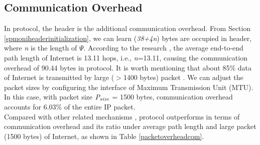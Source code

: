 \subsection{Communication Overhead}
In \name{} protocol, the \name{} header is the additional communication overhead. From Section \ref{spmoniheaderinitialization}, we can learn (\emph{38+4n}) bytes are occupied in \name{} header, where \emph{n} is the length of $\Psi$. According to the research \cite{huffaker2002distance}, the average end-to-end path length of Internet is 13.11 hops, i.e., \emph{n}=13.11, causing the communication overhead of 90.44 bytes in \name{} protocol.
It is worth mentioning that about 85\% data of Internet is transmitted by large ($>$1400 bytes) packet \cite{portionlargepkt}. 
We can adjust the packet sizes by configuring the interface of Maximum Transmission Unit (MTU). In this case, with packet size $\emph{P}_{\emph{size}}$ = 1500 bytes, \name{} communication overhead accounts for 6.03\% of the entire IP packet.\\
\indent
Compared with other related mechanisms \cite{kim2014lightweight} \cite{cai2015source} \cite{basescu2016high} \cite{naous2011verifying}, \name{} protocol outperforms in terms of communication overhead and its ratio under average path length and large packet (1500 bytes) of Internet, as shown in Table \ref{packetoverheadcom}.

